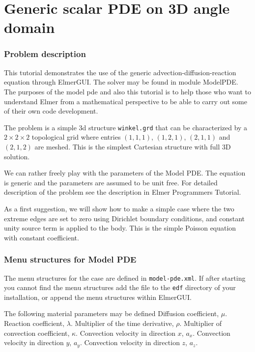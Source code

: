 \chapter{Generic scalar PDE on 3D angle domain}



\subsection*{Problem description}

This tutorial demonstrates the use of the generic advection-diffusion-reaction 
equation through ElmerGUI. The solver may be found in module ModelPDE. 
The purposes of the model pde and also this tutorial is to help 
those who want to understand Elmer from a mathematical perspective to be
able to carry out some of their own code development. 

The problem is a simple 3d structure \texttt{winkel.grd} that can be characterized by a 
$2\times 2\times 2$ topological grid where entries $(1,1,1)$, $(1,2,1)$, $(2,1,1)$ and
$(2,1,2)$ are meshed. This is the simplest Cartesian structure with full 3D 
solution. 

We can rather freely play with the parameters of the Model PDE. The equation is 
generic and the parameters are assumed to be unit free. 
For detailed description of the problem see the description in Elmer Programmers Tutorial.

As a first suggestion, we will show how to make a simple case where the two extreme edges 
are set to zero using Dirichlet boundary conditions, and constant unity source term is 
applied to the body. This is the simple Poisson equation with constant coefficient. 

\subsection*{Menu structures for Model PDE}

The menu structures for the case are defined in \texttt{model-pde.xml}. If after starting
you cannot find the menu structures add the file to the \texttt{edf} directory of your installation,
or append the menu structures within ElmerGUI. 

\noindent 
The following material parameters may be defined
\sifbegin
{}
Diffusion coefficient, $\mu$.
Reaction coefficient, $\lambda$.
Multiplier of the time derivative, $\rho$.
Multiplier of convection coefficient, $\kappa$.
Convection velocity in direction $x$, $a_x$.
Convection velocity in direction $y$, $a_y$.
Convection velocity in direction $z$, $a_z$.
\sifend

